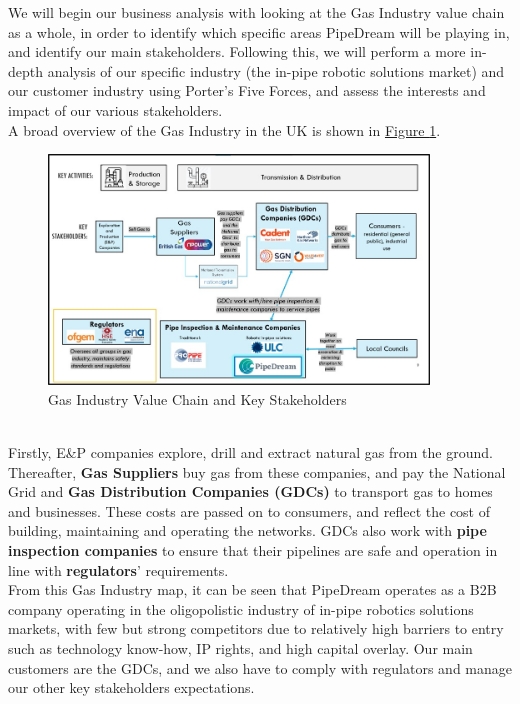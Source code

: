 \documentclass[11pt]{article}		%
\newcommand{\figref}[1]{\hyperref[#1]{Figure \ref*{#1}}}    %
\begin{document}
		We will begin our business analysis with looking at the Gas Industry value chain as a whole, in order to identify which specific areas PipeDream will be playing in, and identify our main stakeholders. Following this, we will perform a more in-depth analysis of our specific industry (the in-pipe robotic solutions market) and our customer industry using Porter’s Five Forces, and assess the interests and impact of our various stakeholders. 
        \\
        \hspace*{3ex}A broad overview of the Gas Industry in the UK is shown in \figref{Industry Value Chain}.
		\begin{figure}[h]
				\centering
				\includegraphics[width=0.9\textwidth]{industryvaluechain.jpg}
				\caption{Gas Industry Value Chain and Key Stakeholders}
				\label{Industry Value Chain}
			\end{figure}
		\\
        \hspace*{3ex}Firstly, E\&P companies explore, drill and extract natural gas from the ground. Thereafter, \textbf{Gas Suppliers} buy gas from these companies, and pay the National Grid and \textbf{Gas Distribution Companies (GDCs)} to transport gas to homes and businesses. These costs are passed on to consumers, and reflect the cost of building, maintaining and operating the networks. GDCs also work with \textbf{pipe inspection companies} to ensure that their pipelines are safe and operation in line with \textbf{regulators}’ requirements. 
        \\
        \hspace*{3ex}From this Gas Industry map, it can be seen that PipeDream operates as a B2B company operating in the oligopolistic industry of in-pipe robotics solutions markets, with few but strong competitors due to relatively high barriers to entry such as technology know-how, IP rights, and high capital overlay. Our main customers are the GDCs, and we also have to comply with regulators and manage our other key stakeholders expectations. 
\end{document}
